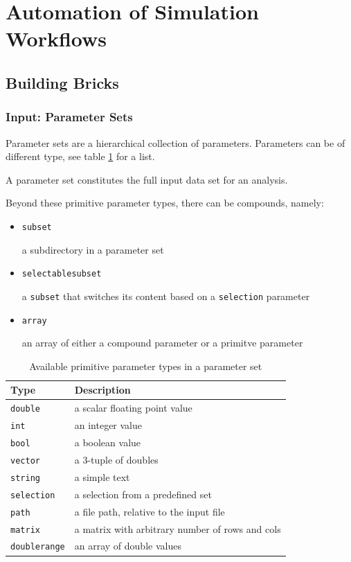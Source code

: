 \section{Automation of Simulation Workflows}

\subsection{Building Bricks}

\subsubsection{Input: Parameter Sets}

Parameter sets are a hierarchical collection of parameters. Parameters can be of different type, see table \ref{tab:parameters} for a list.

A parameter set constitutes the full input data set for an analysis.

Beyond these primitive parameter types, there can be compounds, namely:
\begin{itemize}
\item \texttt{subset}

a subdirectory in a parameter set

\item \texttt{selectablesubset}

a \texttt{subset} that switches its content based on a \texttt{selection} parameter

\item \texttt{array}

an array of either a compound parameter or a primitve parameter
\end{itemize}

\begin{table}[h!]
\centering
\begin{tabular}{ll}
\hline
Type & Description \\
\hline\hline
\texttt{double} & a scalar floating point value\\
\texttt{int} & an integer value\\
\texttt{bool} & a boolean value\\
\texttt{vector} & a 3-tuple of doubles\\
\texttt{string} & a simple text\\
\texttt{selection} & a selection from a predefined set\\
\texttt{path} & a file path, relative to the input file\\
\texttt{matrix} & a matrix with arbitrary number of rows and cols\\
\texttt{doublerange} & an array of double values\\
\hline
\end{tabular}
\caption{Available primitive parameter types in a parameter set}
\label{tab:parameters}
\end{table}

